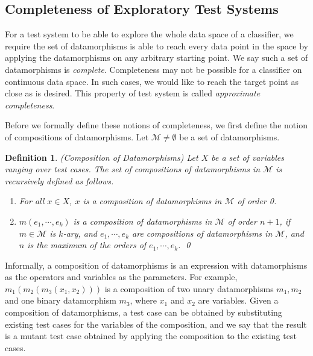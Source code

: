 \documentclass[preprint,1p,authoryear,times]{elsarticle}
\newtheorem{Definition}{Definition}
\begin{document}
\subsection{Completeness of Exploratory Test Systems}

For a test system to be able to explore the whole data space of a classifier, we require the set of datamorphisms is able to reach every data point in the space by applying the datamorphisms on any arbitrary starting point. We say such a set of datamorphisms is \emph{complete}. Completeness may not be possible for a classifier on continuous data space. In such cases, we would like to reach the target point as close as is desired. This property of test system is called \emph{approximate completeness}. 

Before we formally define these notions of completeness, we first define the notion of compositions of datamorphisms. Let $\mathscr{M} \neq \emptyset$ be a set of datamorphisms. 

\begin{Definition}\label{def:composition} (Composition of Datamorphisms)
Let $X$ be a set of variables ranging over test cases. The set of compositions of datamorphisms in $\mathscr{M}$ is recursively defined as follows. 
\begin{enumerate}
\item For all $x \in X$, $x$ is a composition of datamorphisms in $\mathscr{M}$ of order 0.
\item $m(e_1, \cdots, e_k)$ is a composition of datamorphisms in $\mathscr{M}$ of order $n+1$, if $m \in \mathscr{M}$ is $k$-ary, and $e_1, \cdots, e_k$ are compositions of datamorphisms in $\mathscr{M}$, and $n$ is the maximum of the orders of $e_1, \cdots, e_k$. \qed
\end{enumerate}
\end{Definition}

Informally, a composition of datamorphisms is an expression with datamorphisms as the operators and variables as the parameters. For example, $m_1(m_2(m_3(x_1, x_2)))$ is a composition of two unary datamorphisms $m_1, m_2$ and one binary datamorphism $m_3$, where $x_1$ and $x_2$ are variables. Given a composition of datamorphisms, a test case can be obtained by substituting existing test cases for the variables of the composition, and we say that the result is a mutant test case obtained by applying the composition to the existing test cases. 
\end{document}
